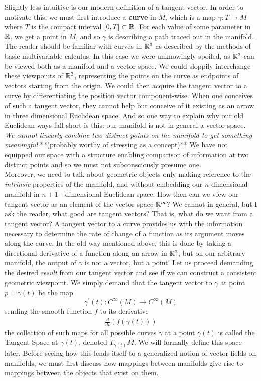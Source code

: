  Slightly less intuitive is our modern definition of a tangent vector.  In order to motivate this, we must first introduce a \textbf{curve} in $M$, which is a map $\gamma: T \to M$ where $T$ is the compact interval $[0, T] \subset \mathbb{R}$.  For each value of some parameter in $\mathbb{R}$, we get a point in $M$, and so $\gamma$ is describing a path traced out in the manifold.  The reader should be familiar with curves in $\mathbb{R}^3$ as described by the methods of basic multivariable calculus.  In this case we were unknowingly spoiled, as $\mathbb{R}^3$ can be viewed both as a manifold and a vector space.  We could sloppily interchange these viewpoints of $\mathbb{R}^3$, representing the points on the curve as endpoints of vectors starting from the origin.  We could then acquire the tangent vector to a curve by differentiating the position vector component-wise.  When  one conceives of such a tangent vector, they cannot help but conceive of it existing as an arrow in three dimensional Euclidean space. And so one way to explain why our old Euclidean ways fall short is this: our manifold is not in general a vector space.  \textit{We cannot linearly combine two distinct points on the manifold to get something meaningful.}**(probably worthy of stressing as a concept)**  We have not equipped our space with a structure enabling comparison of information at two distinct points and so we must not subconsciously presume one.\\
 
   Moreover, we need to talk about geometric objects only making reference to the \textit{intrinsic} properties of the manifold, and without embedding our $n$-dimensional manifold in $n+1$ - dimensional Euclidean space. How then can we view our tangent vector as an element of the vector space $\mathbb{R}^{m}$? We cannot in general, but I ask the reader, what good are tangent vectors?  That is, what do we want from a tangent vector?  A tangent vector to a curve provides us with the information necessary to determine the rate of change of a function as its argument moves along the curve.  In the old way mentioned above, this is done by taking a directional derivative of a function along an arrow in $\mathbb{R}^3$, but on our arbitrary manifold, the output of $\gamma$ is not a vector, but a point!  Let us proceed demanding the desired \textit{result} from our tangent vector and see if we can construct a consistent geometric viewpoint.  We simply demand that the tangent vector to $\gamma$ at point $p = \gamma(t)$ be the map 
   \begin{equation*}
   	\gamma^\prime(t): C^\infty(M) \to C^\infty(M)
   \end{equation*}
   sending the smooth function $f$ to its derivative 
\begin{align*}
	\frac{d}{dt}(f(\gamma(t)))
\end{align*}
the collection of such maps for all possible curves $\gamma$ at a point $\gamma(t)$ is called the Tangent Space at $\gamma(t)$, denoted $T_{\gamma(t)}M$.  We will formally define this space later.  Before seeing how this lends itself to a generalized notion of vector fields on manifolds, we must first discuss how mappings between manifolds give rise to mappings between the objects that exist on them. 

